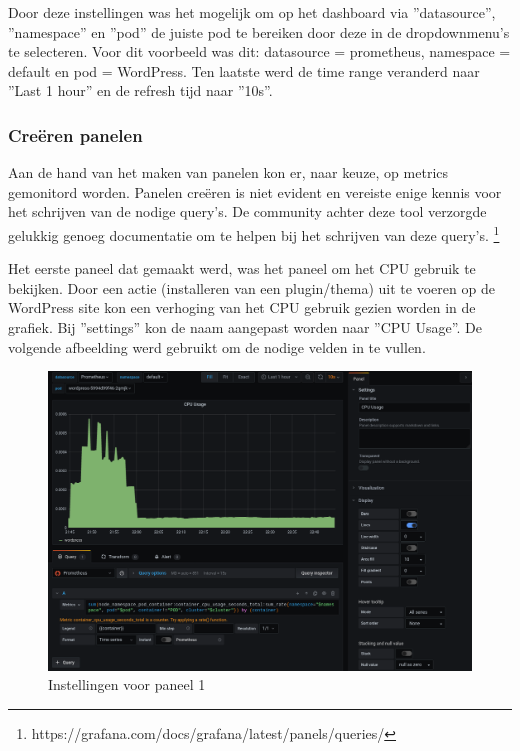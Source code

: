 Door deze instellingen was het mogelijk om op het dashboard via ''datasource'', ''namespace'' en ''pod'' de juiste pod te bereiken door deze in de dropdownmenu's te selecteren. Voor dit voorbeeld was dit: datasource = prometheus, namespace = default en pod = WordPress. Ten laatste werd de time range veranderd naar ''Last 1 hour'' en de refresh tijd naar ''10s''.
\clearpage
\subsubsection{Creëren panelen}

Aan de hand van het maken van panelen kon er, naar keuze, op metrics gemonitord worden. Panelen creëren is niet evident en vereiste enige kennis voor het schrijven van de nodige query's. De community achter deze tool verzorgde gelukkig genoeg documentatie om te helpen bij het schrijven van deze query's. \footnote{https://grafana.com/docs/grafana/latest/panels/queries/}

Het eerste paneel dat gemaakt werd, was het paneel om het CPU gebruik te bekijken. Door een actie (installeren van een plugin/thema) uit te voeren op de WordPress site kon een verhoging van het CPU gebruik gezien worden in de grafiek. Bij ''settings'' kon de naam aangepast worden naar ''CPU Usage''. De volgende afbeelding werd gebruikt om de nodige velden in te vullen. 

\begin{figure}[!hb]
    \centering
        \includegraphics[width=1.1\textwidth]{img/panel1.png}
    \caption{Instellingen voor paneel 1 \autocite{Grafana}}
\end{figure}


